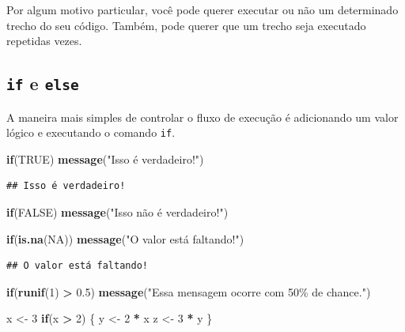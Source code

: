\documentclass[
]{book}
\newenvironment{Shaded}{\begin{snugshade}}{\end{snugshade}}
\newcommand{\ConstantTok}[1]{\textcolor[rgb]{0.56,0.35,0.01}{#1}}
\newcommand{\ControlFlowTok}[1]{\textcolor[rgb]{0.13,0.29,0.53}{\textbf{#1}}}
\newcommand{\DecValTok}[1]{\textcolor[rgb]{0.00,0.00,0.81}{#1}}
\newcommand{\FloatTok}[1]{\textcolor[rgb]{0.00,0.00,0.81}{#1}}
\newcommand{\FunctionTok}[1]{\textcolor[rgb]{0.13,0.29,0.53}{\textbf{#1}}}
\newcommand{\NormalTok}[1]{#1}
\newcommand{\OtherTok}[1]{\textcolor[rgb]{0.56,0.35,0.01}{#1}}
\newcommand{\SpecialCharTok}[1]{\textcolor[rgb]{0.81,0.36,0.00}{\textbf{#1}}}
\newcommand{\StringTok}[1]{\textcolor[rgb]{0.31,0.60,0.02}{#1}}
\begin{document}
Por algum motivo particular, você pode querer executar ou não um determinado trecho do seu código.
Também, pode querer que um trecho seja executado repetidas vezes.

\subsection{\texorpdfstring{\texttt{if} e \texttt{else}}{if e else}}\label{if-e-else}

A maneira mais simples de controlar o fluxo de execução é adicionando um valor lógico e executando o comando \texttt{if}.

\begin{Shaded}
\begin{Highlighting}[]
\ControlFlowTok{if}\NormalTok{(}\ConstantTok{TRUE}\NormalTok{) }\FunctionTok{message}\NormalTok{(}\StringTok{"Isso é verdadeiro!"}\NormalTok{)}
\end{Highlighting}
\end{Shaded}

\begin{verbatim}
## Isso é verdadeiro!
\end{verbatim}

\begin{Shaded}
\begin{Highlighting}[]
\ControlFlowTok{if}\NormalTok{(}\ConstantTok{FALSE}\NormalTok{) }\FunctionTok{message}\NormalTok{(}\StringTok{"Isso não é verdadeiro!"}\NormalTok{)}

\ControlFlowTok{if}\NormalTok{(}\FunctionTok{is.na}\NormalTok{(}\ConstantTok{NA}\NormalTok{)) }\FunctionTok{message}\NormalTok{(}\StringTok{"O valor está faltando!"}\NormalTok{)}
\end{Highlighting}
\end{Shaded}

\begin{verbatim}
## O valor está faltando!
\end{verbatim}

\begin{Shaded}
\begin{Highlighting}[]
\ControlFlowTok{if}\NormalTok{(}\FunctionTok{runif}\NormalTok{(}\DecValTok{1}\NormalTok{) }\SpecialCharTok{\textgreater{}} \FloatTok{0.5}\NormalTok{) }\FunctionTok{message}\NormalTok{(}\StringTok{"Essa mensagem ocorre com 50\% de chance."}\NormalTok{)}

\NormalTok{x }\OtherTok{\textless{}{-}} \DecValTok{3}
\ControlFlowTok{if}\NormalTok{(x }\SpecialCharTok{\textgreater{}} \DecValTok{2}\NormalTok{) \{}
\NormalTok{  y }\OtherTok{\textless{}{-}} \DecValTok{2} \SpecialCharTok{*}\NormalTok{ x}
\NormalTok{  z }\OtherTok{\textless{}{-}} \DecValTok{3} \SpecialCharTok{*}\NormalTok{ y }
\NormalTok{\}}
\end{Highlighting}
\end{Shaded}
\end{document}
